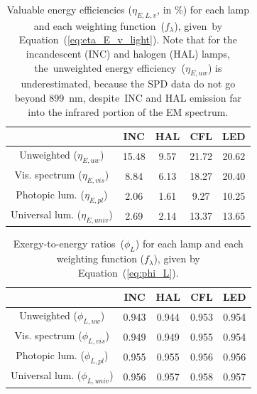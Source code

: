 \documentclass[energies,article,accept,moreauthors,pdftex]{Definitions/mdpi}\usepackage[]{graphicx}\usepackage[]{color}
\begin{document}
\unskip
\begin{table}[H]
\centering
\caption{Valuable energy efficiencies
                     ($\eta_{E,L,v}$, in \%) for each lamp
                     and each weighting function~($f_\lambda$),
                     \mbox{given by} Equation~(\ref{eq:eta_E_v_light}).
                     Note that for the incandescent (INC) and halogen (HAL) lamps, 
                     \mbox{the unweighted} energy efficiency~($\eta_{E,uw}$) is  
                     underestimated, because
                     the SPD data do not go beyond 899~nm, 
                     \mbox{despite INC} and HAL emission far into 
                     the infrared portion of the EM spectrum.} 
\label{tab:results_etas}
\begingroup\footnotesize
\begin{tabular}{ccccc}
  \toprule
 & \textbf{INC} & \textbf{HAL} & \textbf{CFL} & \textbf{LED} \\ 
  \midrule
Unweighted ($\eta_{E,uw}$) & 15.48 & 9.57 & 21.72 & 20.62 \\ 
  Vis. spectrum ($\eta_{E,vis}$) & 8.84 & 6.13 & 18.27 & 20.40 \\ 
  Photopic lum. ($\eta_{E,pl}$) & 2.06 & 1.61 & 9.27 & 10.25 \\ 
  Universal lum. ($\eta_{E,univ}$) & 2.69 & 2.14 & 13.37 & 13.65 \\ 
   \bottomrule
\end{tabular}
\endgroup
\end{table}
\unskip
\begin{table}[H]
\centering
\caption{Exergy-to-energy ratios~($\phi_L$) 
                     for each lamp 
                     and each weighting function ($f_{\lambda}$),
                     given by Equation~(\ref{eq:phi_L}).} 
\label{tab:results_phis}
\begingroup\footnotesize
\begin{tabular}{ccccc}
  \toprule
 & \textbf{INC} & \textbf{HAL} & \textbf{CFL} & \textbf{LED} \\ 
  \midrule
Unweighted ($\phi_{L,uw}$) & 0.943 & 0.944 & 0.953 & 0.954 \\ 
  Vis. spectrum ($\phi_{L,vis}$) & 0.949 & 0.949 & 0.955 & 0.954 \\ 
  Photopic lum. ($\phi_{L,pl}$) & 0.955 & 0.955 & 0.956 & 0.956 \\ 
  Universal lum. ($\phi_{L,univ}$) & 0.956 & 0.957 & 0.958 & 0.957 \\ 
   \bottomrule
\end{tabular}
\endgroup
\end{table}
\unskip
\end{document}
